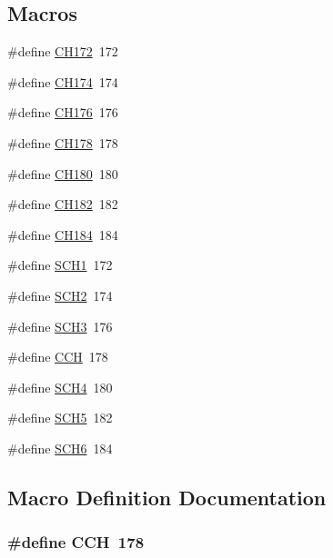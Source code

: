 \subsection*{Macros}
\begin{DoxyCompactItemize}
\item 
\#define \hyperlink{channel-manager_8h_a5106ef73019b4b24c3e89a0605bc4686}{C\+H172}~172
\item 
\#define \hyperlink{channel-manager_8h_ae2cb922871f4ffbc84b42eabd2b90c37}{C\+H174}~174
\item 
\#define \hyperlink{channel-manager_8h_abc94c859f1ddfc781dad0604735c5394}{C\+H176}~176
\item 
\#define \hyperlink{channel-manager_8h_a314aa5e24db20bcf2d64b72a9be09cf4}{C\+H178}~178
\item 
\#define \hyperlink{channel-manager_8h_ab4349223a1c7fe07894a6ee73e09997d}{C\+H180}~180
\item 
\#define \hyperlink{channel-manager_8h_a15a603a1a28bc32d868ef5578e4b99f3}{C\+H182}~182
\item 
\#define \hyperlink{channel-manager_8h_a8f1e7f245cdbcf610be6df2fc5c9e514}{C\+H184}~184
\item 
\#define \hyperlink{channel-manager_8h_a456a1b730523e5d3b8a29fb227d10028}{S\+C\+H1}~172
\item 
\#define \hyperlink{channel-manager_8h_a07a0bff852fe2b8538a46d6e779546b6}{S\+C\+H2}~174
\item 
\#define \hyperlink{channel-manager_8h_ad3135bbb37bccc4d3d6a2bf4545cf7a5}{S\+C\+H3}~176
\item 
\#define \hyperlink{channel-manager_8h_a52d2f169cde2f6abe66ecc83f0d7ad80}{C\+CH}~178
\item 
\#define \hyperlink{channel-manager_8h_ab57f1414f1847a896d2b7f5f49c916ea}{S\+C\+H4}~180
\item 
\#define \hyperlink{channel-manager_8h_a130c7e5b0b345ef89bdcfa3dc201c4e6}{S\+C\+H5}~182
\item 
\#define \hyperlink{channel-manager_8h_aaa6c2f65c1bf2134a15028491ac3e5ca}{S\+C\+H6}~184
\end{DoxyCompactItemize}


\subsection{Macro Definition Documentation}
\subsubsection[{\texorpdfstring{C\+CH}{CCH}}]{\setlength{\rightskip}{0pt plus 5cm}\#define C\+CH~178}\hypertarget{channel-manager_8h_a52d2f169cde2f6abe66ecc83f0d7ad80}{}\label{channel-manager_8h_a52d2f169cde2f6abe66ecc83f0d7ad80}
